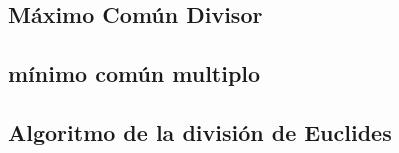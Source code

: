 
    \subsection{Máximo Común Divisor}



    \subsection{mínimo común multiplo}



    \subsection{Algoritmo de la división de Euclides}

